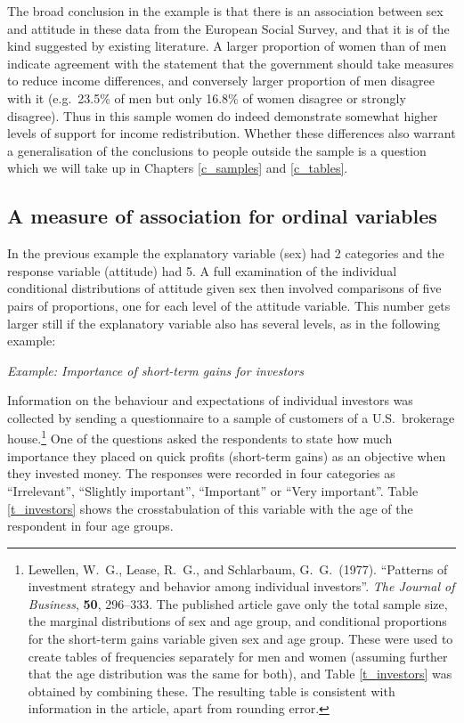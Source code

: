 The broad conclusion in the example is that there is an association
between sex and attitude in these data from the European Social Survey,
and that it is of the kind suggested by existing literature.
A larger proportion of women than of men indicate agreement with
the statement that the government should take measures to reduce income
differences, and conversely larger proportion of men disagree with it
(e.g.\ 23.5\% of men but only 16.8\% of women disagree or strongly
disagree). Thus in this sample women do indeed demonstrate somewhat
higher levels of support for income redistribution. Whether these
differences also warrant a generalisation of the conclusions to people
outside the sample is a question which we will take up in Chapters
\ref{c_samples} and \ref{c_tables}.

\subsection{A measure of association for ordinal variables}
\label{ss_descr1_2cat_gamma}

In the previous example the explanatory variable (sex) had 2 categories
and the response variable (attitude) had 5. A full examination of the
individual conditional distributions of attitude given sex then involved
comparisons of five pairs of proportions, one for each level of the
attitude variable. This number gets larger still if the explanatory
variable also has several levels, as in the following example:

\emph{Example: Importance of short-term gains
for investors}

Information on the behaviour and expectations of individual investors
was collected by sending a questionnaire to a sample of
customers of a U.S.\ brokerage house.\footnote{Lewellen, W.\ G., Lease,
R.\ G., and Schlarbaum, G.\ G.\ (1977). ``Patterns of investment
strategy and behavior among individual investors''. \emph{The Journal of
Business}, \textbf{50}, 296--333. The
published article gave only the total sample size, the marginal
distributions of sex and age group, and conditional proportions for the
short-term gains variable given sex and age group. These were used to
create tables of frequencies
separately for men and women (assuming further that the age distribution was the
same for both), and Table \ref{t_investors} was obtained by combining
these. The resulting table is consistent with information in the article,
apart from rounding error.}
One of the questions asked the respondents to state how much importance
they placed on quick profits (short-term gains) as an objective when
they invested money. The responses were recorded in four categories as
``Irrelevant'', ``Slightly important'', ``Important'' or ``Very
important''. Table \ref{t_investors} shows the crosstabulation of this
variable with the age of the respondent in four age groups.


